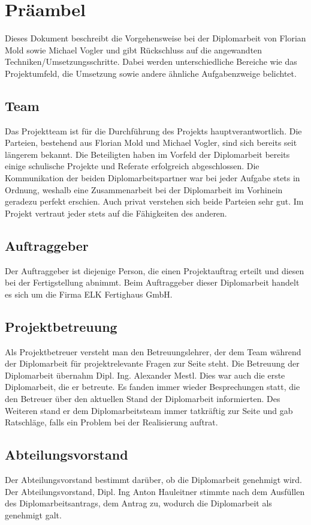 \chapter{Präambel}
Dieses Dokument beschreibt die Vorgehensweise bei der Diplomarbeit von Florian Mold sowie Michael Vogler und gibt Rückschluss auf die angewandten Techniken/Umsetzungsschritte. Dabei werden unterschiedliche Bereiche wie das Projektumfeld, die Umsetzung sowie andere ähnliche Aufgabenzweige belichtet.

\section{Team}
Das Projektteam ist für die Durchführung des Projekts hauptverantwortlich.
Die Parteien, bestehend aus Florian Mold und Michael Vogler, sind sich bereits seit längerem bekannt. Die Beteiligten haben im Vorfeld der Diplomarbeit bereits einige schulische Projekte und Referate erfolgreich abgeschlossen. Die Kommunikation der beiden Diplomarbeitspartner war bei jeder Aufgabe stets in Ordnung, weshalb eine Zusammenarbeit bei der Diplomarbeit im Vorhinein geradezu perfekt erschien. Auch privat verstehen sich beide Parteien sehr gut. Im Projekt vertraut jeder stets auf die Fähigkeiten des anderen.

\section{Auftraggeber}
Der Auftraggeber ist diejenige Person, die einen Projektauftrag erteilt und diesen bei der Fertigstellung abnimmt.
Beim Auftraggeber dieser Diplomarbeit handelt es sich um die Firma ELK Fertighaus GmbH. 

\section{Projektbetreuung}
Als Projektbetreuer versteht man den Betreuungslehrer, der dem Team während der Diplomarbeit für projektrelevante Fragen zur Seite steht.
Die Betreuung der Diplomarbeit übernahm Dipl. Ing. Alexander Mestl. Dies war auch die erste Diplomarbeit, die er betreute. Es fanden immer wieder Besprechungen statt, die den Betreuer über den aktuellen Stand der Diplomarbeit informierten. Des Weiteren stand er dem Diplomarbeitsteam immer tatkräftig zur Seite und gab Ratschläge, falls ein Problem bei der Realisierung auftrat.

\section{Abteilungsvorstand}
Der Abteilungsvorstand bestimmt darüber, ob die Diplomarbeit genehmigt wird. Der Abteilungsvorstand, Dipl. Ing Anton Hauleitner stimmte nach dem Ausfüllen des Diplomarbeitsantrags, dem Antrag zu, wodurch die Diplomarbeit als genehmigt galt.

